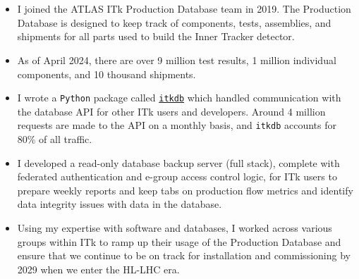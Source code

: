 \\

\\

\begin{itemize}
  \item I joined the ATLAS ITk Production Database team in 2019. The Production Database is designed to keep track of components, tests, assemblies, and shipments for all parts used to build the Inner Tracker detector.
  \item As of April 2024, there are over 9 million test results, 1 million individual components, and 10 thousand shipments.
  \item I wrote a \texttt{Python} package called \href{https://itkdb.docs.cern.ch/latest/}{\texttt{itkdb}} which handled communication with the database API for other ITk users and developers. Around 4 million requests are made to the API on a monthly basis, and \texttt{itkdb} accounts for 80\% of all traffic.
  \item I developed a read-only database backup server (full stack), complete with federated authentication and e-group access control logic, for ITk users to prepare weekly reports and keep tabs on production flow metrics and identify data integrity issues with data in the database.
  \item Using my expertise with software and databases, I worked across various groups within ITk to ramp up their usage of the Production Database and ensure that we continue to be on track for installation and commissioning by 2029 when we enter the HL-LHC era.
\end{itemize}

\\

